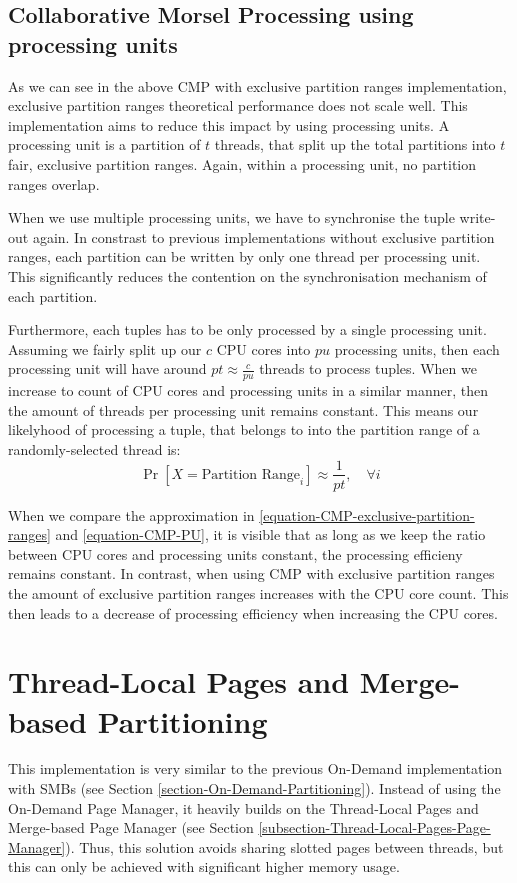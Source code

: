 \subsection{Collaborative Morsel Processing using processing units}
As we can see in the above \ac{CMP} with exclusive partition ranges implementation, exclusive partition ranges theoretical performance does not scale well.
This implementation aims to reduce this impact by using processing units.
A processing unit is a partition of $t$ threads, that split up the total partitions into $t$ fair, exclusive partition ranges.
Again, within a processing unit, no partition ranges overlap.

When we use multiple processing units, we have to synchronise the tuple write-out again.
In constrast to previous implementations without exclusive partition ranges, each partition can be written by only one thread per processing unit.
This significantly reduces the contention on the synchronisation mechanism of each partition.

Furthermore, each tuples has to be only processed by a single processing unit.
Assuming we fairly split up our $c$ \ac{CPU} cores into $pu$ processing units, then each processing unit will have around $pt\approx\frac{c}{pu}$ threads to process tuples.
When we increase to count of CPU cores and processing units in a similar manner, then the amount of threads per processing unit remains constant.
This means our likelyhood of processing a tuple, that belongs to into the partition range of a randomly-selected thread is:
\begin{equation}\label{equation-CMP-PU}
  \Pr[X=\textrm{Partition Range}_i] \approx \frac{1}{pt},  \quad \forall i
\end{equation}

When we compare the approximation in \ref{equation-CMP-exclusive-partition-ranges} and \ref{equation-CMP-PU}, it is visible that as long as we keep the ratio between CPU cores and processing units constant, the processing efficieny remains constant.
In contrast, when using \acl{CMP} with exclusive partition ranges the amount of exclusive partition ranges increases with the CPU core count.
This then leads to a decrease of processing efficiency when increasing the CPU cores.

\section{Thread-Local Pages and Merge-based Partitioning}
This implementation is very similar to the previous On-Demand implementation with \aclp{SMB} (see Section \ref{section-On-Demand-Partitioning}).
Instead of using the On-Demand Page Manager, it heavily builds on the Thread-Local Pages and Merge-based Page Manager (see Section \ref{subsection-Thread-Local-Pages-Page-Manager}).
Thus, this solution avoids sharing slotted pages between threads, but this can only be achieved with significant higher memory usage.


